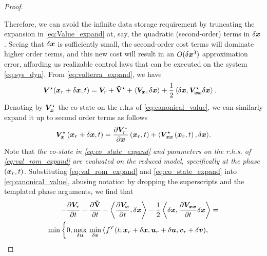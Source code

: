 \begin{proof}
\begin{itemize}
	\end{itemize}
	Therefore, we can avoid the infinite data storage requirement by truncating the expansion in \eqref{eq:Value_expand} at, say, the quadratic (second-order) terms in $\delta \bm{x}$. Seeing that $\delta \bm{x}$ is sufficiently small, the second-order cost terms will dominate higher order terms, and this new cost will result in an $O(\delta \bm{x}^3)$ approximation error, affording us realizable control laws that can be executed on the system \eqref{eq:sys_dyn}. From \eqref{eq:volterra_expand}, we have
	\begin{align}
		\valuefunc^\star(\state_r + \delta \state, t) &= \valuefunc_r + \costdiff^\star + \left\langle\valuefunc_{\state}, \delta \state \right\rangle +  \dfrac{1}{2} \left\langle \delta \state, \valuefunc^\star_{\state\state} \delta\state \right\rangle.
		\label{eq:val_rom_expand}
	\end{align}
	Denoting by $\bm{V}_{\bm{x}}^\star$ the co-state on the r.h.s of \eqref{eq:canonical_value}, we  can similarly expand it up to second order terms as follows
	\begin{align}
		\valuefunc_{\state}^\star\left(\state_r + \delta \state, t \right) = \dfrac{\partial \valuefunc^\star_r}{\partial \state}\left(\state_r , t \right) + \langle \valuefunc^\star_{\state\state}\left(\state_r , t \right), \delta \state \rangle.
		\label{eq:co_state_expand}
	\end{align}
	Note that \textit{the co-state in \eqref{eq:co_state_expand} and parameters on the r.h.s. of \eqref{eq:val_rom_expand} are evaluated on the reduced model, specifically at the phase $\left(\bm{x}_r, t\right)$}. Substituting \eqref{eq:val_rom_expand} and \eqref{eq:co_state_expand} into \eqref{eq:canonical_value}, abusing notation by dropping the superscripts and the templated phase arguments, we find that
	\begin{align}
		\begin{split} 
			-\frac{\partial \valuefunc_r}{\partial t} -\frac{\partial \costdiff}{\partial t} - \left\langle \dfrac{\partial\valuefunc_{\state}}{\partial t}, \delta\state \right \rangle -  \dfrac{1}{2} \left\langle \delta \state, \dfrac{\partial \valuefunc_{\state\state} }{\partial t}\delta\state \right \rangle &=  \\
			\min \left\{0,  
			\max_{\delta \control} \, \min_{\delta \disturb} \left\langle f^T(t; \state_r + \delta \state, \control_r + \delta \control,  \disturb_r + \delta \disturb), \right. \right. \\

\end{split}
\end{align}
\end{proof}
